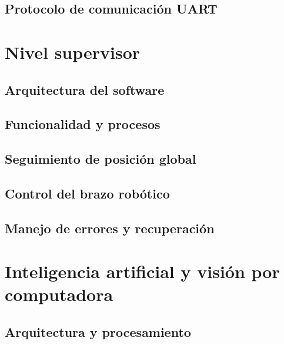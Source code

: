 \documentclass[a4paper,12pt]{report}
\begin{document}
\subsection{Protocolo de comunicación UART}



\section{Nivel supervisor}

\subsection{Arquitectura del software}


\subsection{Funcionalidad y procesos}


\subsection{Seguimiento de posición global}


\subsection{Control del brazo robótico}


\subsection{Manejo de errores y recuperación}


\section{Inteligencia artificial y visión por computadora}

\subsection{Arquitectura y procesamiento}

\end{document}
